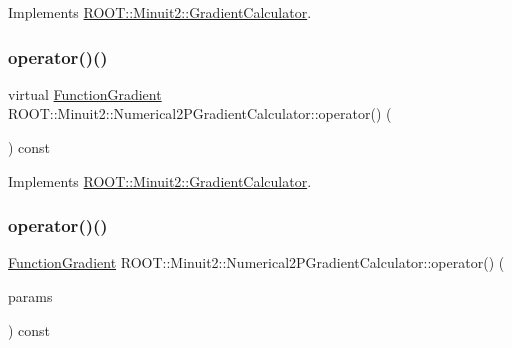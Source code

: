 Implements \mbox{\hyperlink{classROOT_1_1Minuit2_1_1GradientCalculator_a1bae913e96ffc9ece28664a5f6f79cb0}{R\+O\+O\+T\+::\+Minuit2\+::\+Gradient\+Calculator}}.

\mbox{\label{classROOT_1_1Minuit2_1_1Numerical2PGradientCalculator_a8c90cd467631ecc4cac72187de948b05}} 
\subsubsection{\texorpdfstring{operator()()}{operator()()}\hspace{0.1cm}{\footnotesize\ttfamily [2/6]}}
{\footnotesize\ttfamily virtual \mbox{\hyperlink{classROOT_1_1Minuit2_1_1FunctionGradient}{Function\+Gradient}} R\+O\+O\+T\+::\+Minuit2\+::\+Numerical2\+P\+Gradient\+Calculator\+::operator() (\begin{DoxyParamCaption}\item[{const \mbox{\hyperlink{classROOT_1_1Minuit2_1_1MinimumParameters}{Minimum\+Parameters}} \&}]{ }\end{DoxyParamCaption}) const\hspace{0.3cm}{\ttfamily [virtual]}}



Implements \mbox{\hyperlink{classROOT_1_1Minuit2_1_1GradientCalculator_a1bae913e96ffc9ece28664a5f6f79cb0}{R\+O\+O\+T\+::\+Minuit2\+::\+Gradient\+Calculator}}.

\mbox{\label{classROOT_1_1Minuit2_1_1Numerical2PGradientCalculator_ae0501810e548a264aa74855d586b0d13}} 
\subsubsection{\texorpdfstring{operator()()}{operator()()}\hspace{0.1cm}{\footnotesize\ttfamily [3/6]}}
{\footnotesize\ttfamily \mbox{\hyperlink{classROOT_1_1Minuit2_1_1FunctionGradient}{Function\+Gradient}} R\+O\+O\+T\+::\+Minuit2\+::\+Numerical2\+P\+Gradient\+Calculator\+::operator() (\begin{DoxyParamCaption}\item[{const std\+::vector$<$ double $>$ \&}]{params }\end{DoxyParamCaption}) const\hspace{0.3cm}{\ttfamily [virtual]}}

